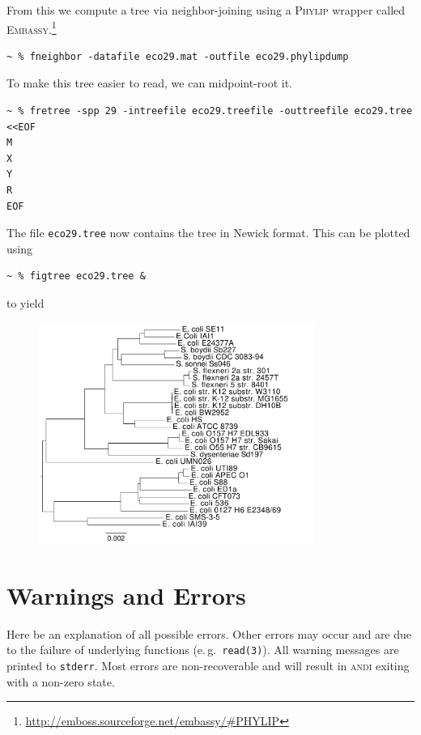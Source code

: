\documentclass[a4paper,
  10pt,
  english,
  DIV=12,
  BCOR=8mm]{scrbook}
\newcommand{\algo}[1]{\textsc{{#1}}}
\newcommand{\andi}{\algo{andi}\xspace}
\begin{document}
\noindent From this we compute a tree via neighbor-joining using a \algo{Phylip} wrapper called \algo{Embassy}.\footnote{\url{http://emboss.sourceforge.net/embassy/\#PHYLIP}}

\begin{lstlisting}
~ % fneighbor -datafile eco29.mat -outfile eco29.phylipdump
\end{lstlisting}
\noindent To make this tree easier to read, we can midpoint-root it.
\begin{lstlisting}
~ % fretree -spp 29 -intreefile eco29.treefile -outtreefile eco29.tree <<EOF
M
X
Y
R
EOF
\end{lstlisting}

\noindent The file \lstinline$eco29.tree$ now contains the tree in Newick format. This can be plotted using \cite{figtree}

\begin{lstlisting}
~ % figtree eco29.tree &
\end{lstlisting}

\noindent to yield

\begin{figure}[h]
  \centering\includegraphics[width=0.8\textwidth]{andi_labels.pdf}
\end{figure}


\chapter{Warnings and Errors}

Here be an explanation of all possible errors. Other errors may occur and are due to the failure of underlying functions (e.\,g.~\lstinline$read(3)$). All warning messages are printed to \lstinline$stderr$. Most errors are non-recoverable and will result in \andi exiting with a non-zero state.
\end{document}
